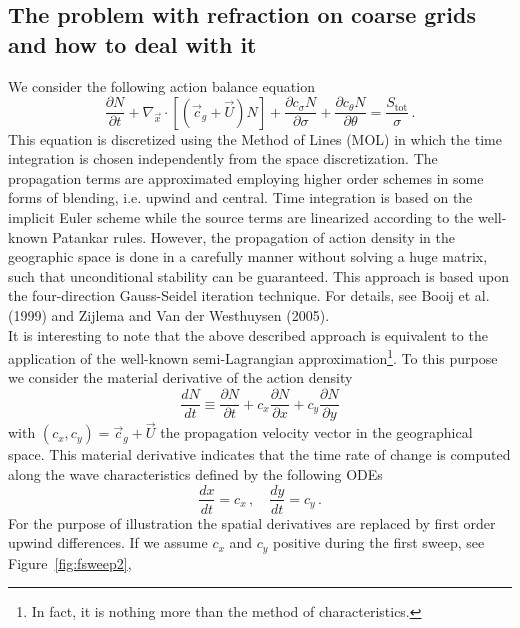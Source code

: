 \documentclass[12pt]{book}
\begin{document}
\subsection{The problem with refraction on coarse grids and how to deal with it}

We consider the following action balance equation
\begin{equation}
  \frac{\partial N}{\partial t} + \nabla_{\vec{x}} \cdot [({\vec{c}}_g + \vec{U}) N] +
  \frac{\partial c_\sigma N}{\partial \sigma} +
  \frac{\partial c_\theta N}{\partial \theta} = \frac{S_{\mathrm{tot}}}{\sigma}\, .
  \label{eq:actbal}
\end{equation}
This equation is discretized using the Method of Lines (MOL) in which the time integration is chosen independently from the space discretization. The propagation terms are approximated employing
higher order schemes in some forms of blending, i.e. upwind and central.
Time integration is based on the implicit Euler scheme while the source terms are linearized according to the well-known Patankar rules. However, the propagation
of action density in the geographic space is done in a carefully manner without solving a huge matrix, such that unconditional stability can be guaranteed.
This approach is based upon the four-direction Gauss-Seidel iteration technique. For details, see Booij et al. (1999) and Zijlema and Van der Westhuysen (2005).
\\[2ex]
It is interesting to note that the above described approach is equivalent to the application of the well-known semi-Lagrangian approximation\footnote{In fact, it is nothing more than the method of characteristics.}.
To this purpose we consider the material derivative of the action density
\begin{equation}
  \frac{dN}{dt} \equiv \frac{\partial N}{\partial t} + c_x \frac{\partial N}{\partial x} + c_y\frac{\partial N}{\partial y}
  \label{eq:matder}
\end{equation}
with $(c_x,c_y) = {\vec{c}}_g + \vec{U}$ the propagation velocity vector in the geographical space.
This material derivative indicates that the time rate of change is computed along the wave characteristics defined by the following ODEs
\begin{equation}
  \frac{dx}{dt} = c_x\, , \quad \frac{dy}{dt} = c_y\, .
\end{equation}
For the purpose of illustration the spatial derivatives are replaced by first order upwind differences.
If we assume $c_x$ and $c_y$ positive during the first sweep, see Figure~\ref{fig:fsweep2},
\end{document}
